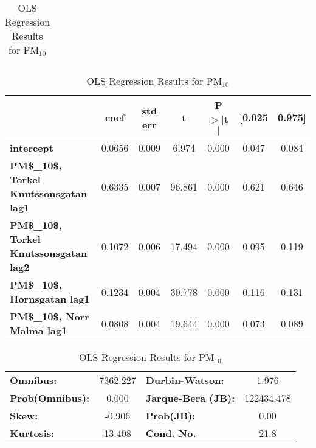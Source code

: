 \begin{landscape}
\begin{table}[h]
\begin{center}
\begin{tabular}{lclc}
\bottomrule
\end{tabular}
\begin{tabular}{lcccccc}
                                                  & \textbf{coef} & \textbf{std err} & \textbf{t} & \textbf{P$> |$t$|$} & \textbf{[0.025} & \textbf{0.975]}  \\
\midrule
\textbf{intercept}                                &       0.0656  &        0.009     &     6.974  &         0.000        &        0.047    &        0.084     \\
\textbf{PM\$\_{10}\$, Torkel Knutssonsgatan lag1} &       0.6335  &        0.007     &    96.861  &         0.000        &        0.621    &        0.646     \\
\textbf{PM\$\_{10}\$, Torkel Knutssonsgatan lag2} &       0.1072  &        0.006     &    17.494  &         0.000        &        0.095    &        0.119     \\
\textbf{PM\$\_{10}\$, Hornsgatan lag1}            &       0.1234  &        0.004     &    30.778  &         0.000        &        0.116    &        0.131     \\
\textbf{PM\$\_{10}\$, Norr Malma lag1}            &       0.0808  &        0.004     &    19.644  &         0.000        &        0.073    &        0.089     \\
\bottomrule
\end{tabular}
\begin{tabular}{lclc}
\textbf{Omnibus:}       & 7362.227 & \textbf{  Durbin-Watson:     } &     1.976   \\
\textbf{Prob(Omnibus):} &   0.000  & \textbf{  Jarque-Bera (JB):  } & 122434.478  \\
\textbf{Skew:}          &  -0.906  & \textbf{  Prob(JB):          } &      0.00   \\
\textbf{Kurtosis:}      &  13.408  & \textbf{  Cond. No.          } &      21.8   \\
\bottomrule
\end{tabular}
\caption{OLS Regression Results for PM$_{10}$}
\end{center}
\end{table}
\end{landscape}

